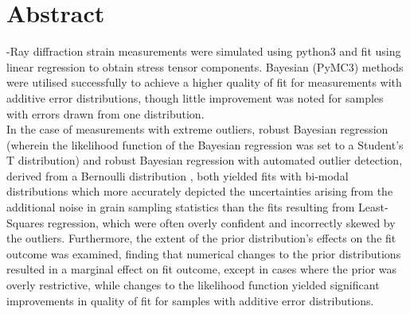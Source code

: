%
%
%

\chapter*{Abstract}
\begin{SingleSpace}
-Ray diffraction strain measurements were simulated using python3 and fit using linear regression to obtain stress tensor components. Bayesian (PyMC3) methods were utilised successfully to achieve a higher quality of fit for measurements with additive error distributions, though little improvement was noted for samples with errors drawn from one distribution.\\
In the case of measurements with extreme outliers, robust Bayesian regression (wherein the likelihood function of the Bayesian regression was set to a Student's T distribution) and robust Bayesian regression with automated outlier detection, derived from a Bernoulli distribution , both yielded fits with bi-modal distributions which more accurately depicted the uncertainties arising from the additional noise in grain sampling statistics than the fits resulting from Least-Squares regression, which were often overly confident and incorrectly skewed by the outliers. Furthermore, the extent of the prior distribution's effects on the fit outcome was examined, finding that numerical changes to the prior distributions resulted in a marginal effect on fit outcome, except in cases where the prior was overly restrictive, while changes to the likelihood function yielded significant improvements in quality of fit for samples with additive error distributions.
\end{SingleSpace}
\clearpage